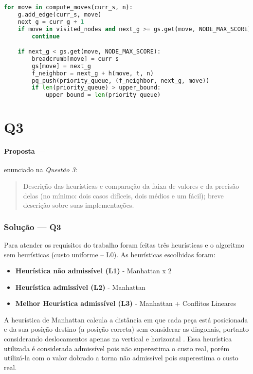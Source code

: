 \documentclass[12pt]{article}
\begin{document}
\begin{lstlisting}[language=Python]
for move in compute_moves(curr_s, n):
    g.add_edge(curr_s, move)
    next_g = curr_g + 1
    if move in visited_nodes and next_g >= gs.get(move, NODE_MAX_SCORE):
        continue

    if next_g < gs.get(move, NODE_MAX_SCORE):
        breadcrumb[move] = curr_s
        gs[move] = next_g
        f_neighbor = next_g + h(move, t, n)
        pq_push(priority_queue, (f_neighbor, next_g, move))
        if len(priority_queue) > upper_bound:
            upper_bound = len(priority_queue)
\end{lstlisting}

\section{Q3}

\paragraph{Proposta ---} enunciado na \textit{Questão 3}:

\begin{quote}
Descrição das heurísticas e comparação da faixa de valores e da precisão delas (no mínimo: dois casos difíceis, dois médios e um fácil); breve descrição sobre suas implementações.
\end{quote}

\subsubsection{Solução --- \textbf{Q3}}

Para atender os requisitos do trabalho foram feitas três heurísticas e o algoritmo sem heurísticas (custo uniforme – L0). As heurísticas escolhidas foram:

\begin{itemize}
    \item \textbf{Heurística não admissível (L1)} - Manhattan x 2
    \item \textbf{Heurística admissível (L2)} - Manhattan
    \item \textbf{Melhor Heurística admissível (L3)} - Manhattan + Conflitos Lineares
\end{itemize}

A heurística de Manhattan calcula a distância em que cada peça está posicionada e da sua posição destino (a posição correta) sem considerar as diagonais, portanto considerando deslocamentos apenas na vertical e horizontal \cite{sharma2016}. Essa heurística utilizada é considerada admissível pois não superestima o custo real, porém utilizá-la com o valor dobrado a torna não admissível pois superestima o custo real.
\end{document}
